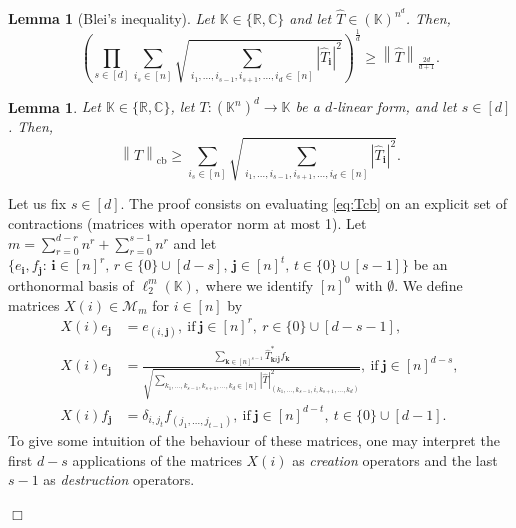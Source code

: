 \documentclass[11pt]{article}
\newcommand{\norm}[1]{\left\|{#1}\right\|}
\theoremstyle{plain}
\newtheorem{lemma}[theorem]{Lemma}
\DeclareMathOperator{\cb}{cb}
\renewcommand{\cb}{{\mathrm{cb}}}
\newcommand{\ind}[1]{\mathbf{#1}}
\theoremstyle{plain}
\theoremstyle{definition}
\theoremstyle{remark}
\renewenvironment{proof}[1][]{
    \begin{trivlist}
    \item[\hspace{\labelsep}{\em\noindent Proof#1:\/}]}
    {{\hfill$\Box$}
    \end{trivlist}
}
\theoremstyle{named}
\begin{document}
\begin{lemma}[Blei's inequality] \label{lem:Bleisinequality}
    Let $\mathbb K\in\{\mathbb R,\mathbb C\}$ and let $\widehat T\in(\mathbb K)^{n^d}$. Then, 
    $$\left(\prod_{s\in[d]}\sum_{i_s\in [n]}\sqrt{\sum_{i_1,\dots,i_{s-1},i_{s+1},\dots,i_d\in [n]}|\widehat T_\ind{i}|^2}\right)^{\frac{1}{d}}\geq \norm{\widehat T}_{\frac{2d}{d+1}}.$$
\end{lemma}
\begin{lemma}\label{lem:lowercb}
    Let $\mathbb K\in\{\mathbb R,\mathbb C\}$, let $T:(\mathbb K^n)^{d}\to \mathbb K$ be a $d$-linear form, and let $s\in [d]$. Then, 
    $$\norm{T}_{\cb}\geq \sum_{i_s\in [n]}\sqrt{\sum_{i_1,\dots,i_{s-1},i_{s+1},\dots,i_d\in [n]}|\widehat T_\ind{i}|^2}.$$
\end{lemma}
\begin{proof}
    Let us fix $s\in [d]$. The proof consists on evaluating \cref{eq:Tcb} on an explicit set of contractions (matrices with operator norm at most 1). Let $m=\sum_{r=0}^{d-r}n^{r}+\sum_{r=0}^{s-1}n^{r}$ and let $\{e_{\ind i},f_{\ind j}:\, \ind i\in [n]^r,\, r\in\{0\}\cup [d-s],\, \ind j\in [n]^t,\, t\in\{0\}\cup [s-1]\}$ be an orthonormal basis of  $\ell_2^m (\mathbb K),$ where we identify $[n]^0$ with $\emptyset$. We define matrices $X(i)\in\mathcal{M}_m$ for $i\in [n]$  by 
    \begin{align*}
        X(i)e_{\ind j}&=e_{(i,\ind j)},\ \mathrm{if\ }\ind j\in [n]^{r},\ r\in \{0\}\cup [d-s-1],\\
        X(i)e_{\ind j}&=\frac{\sum_{\ind k\in [n]^{s-1}}\widehat T_{\ind k i\ind j}^*f_{\ind k}}{\sqrt{\sum_{k_1,\dots,k_{s-1},k_{s+1},\dots,k_d\in [n] }|\widehat T|^2_{(k_1,\dots,k_{s-1},i,k_{s+1},\dots,k_d)}}},\ \mathrm{if\ }\ind j\in [n]^{d-s},\\
        X(i)f_{\ind j}&=\delta_{i,j_{t}}f_{(j_1,\dots,j_{t-1})},\ \mathrm{if}\ \ind j\in [n]^{d-t},\ t\in\{0\}\cup[d-1].
    \end{align*}
    To give some intuition of the behaviour of these matrices, one may interpret the first $d-s$ applications of the matrices $X(i)$ as \emph{creation} operators and the last $s-1$ as \emph{destruction} operators.
    

\end{proof}
\end{document}
